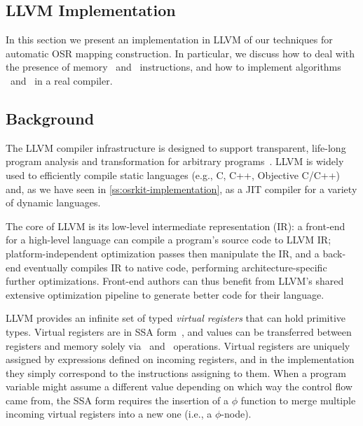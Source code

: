 \subsection{LLVM Implementation}
\label{ss:BC-implementation}
In this section we present an implementation in LLVM of our techniques for automatic OSR mapping construction. In particular, we discuss how to deal with the presence of memory \load\ and \store\ instructions, and how to implement algorithms \apply\ and \buildcomp\ in a real compiler.

\subsection*{Background}
The LLVM compiler infrastructure is designed to support transparent, life-long program analysis and transformation for arbitrary programs~\cite{Lattner04}. LLVM is widely used to efficiently compile static languages (e.g., C, C++, Objective C/C++) and, as we have seen in \mysection\ref{ss:osrkit-implementation}, as a JIT compiler for a variety of dynamic languages.

The core of LLVM is its low-level intermediate representation (IR): a front-end for a high-level language can compile a program's source code to LLVM IR; platform-independent optimization passes then manipulate the IR, and a back-end eventually compiles IR to native code, performing architecture-specific further optimizations. Front-end authors can thus benefit from LLVM's shared extensive optimization pipeline to generate better code for their language.

LLVM provides an infinite set of typed {\em virtual registers} that can hold primitive types. Virtual registers are in SSA form~\cite{Cytron91}, and values can be transferred between registers and memory solely via \load\ and \store\ operations. Virtual registers are uniquely assigned by expressions defined on incoming registers, and in the implementation they simply correspond to the instructions assigning to them. When a program variable might assume a different value depending on which way the control flow came from, the SSA form requires the insertion of a $\phi$ function to merge multiple incoming virtual registers into a new one (i.e., a $\phi$-node).


